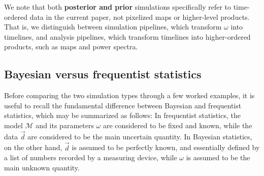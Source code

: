 \documentclass[twocolumn]{aa}%
\renewcommand{\d}[0]{\vec{d}}
\begin{document}
We note that both {\bf posterior and prior} simulations specifically
refer to time-ordered data in the current paper, not pixelized maps
or higher-level products. That is, we distinguish between simulation
pipelines, which transform $\omega$ into timelines, and analysis
pipelines, which transform timelines into higher-ordered products,
such as maps and power spectra. 

\subsection{Bayesian versus frequentist statistics}

Before comparing the two simulation types through a few worked
examples, it is useful to recall the fundamental difference between
Bayesian and frequentist statistics, which may be summarized as
follows: In frequentist statistics, the model $\mathcal{M}$ and its
parameters $\omega$ are considered to be fixed and known, while the
data $\d$ are considered to be the main uncertain quantity. In
Bayesian statistics, on the other hand, $\d$ is assumed to be
perfectly known, and essentially defined by a list of numbers recorded
by a measuring device, while $\omega$ is assumed to be the main
unknown quantity.
\end{document}
